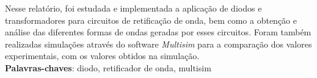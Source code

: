 \setlength{\absparsep}{18pt} %
 \begin{resumo}
 Nesse relat\'{o}rio, foi estudada e implementada a aplica\c{c}\~{a}o de diodos e transformadores para circuitos de retifica\c{c}\~{a}o de onda, bem como a obten\c{c}\~{a}o e an\'{a}lise das diferentes formas de ondas geradas por esses circuitos. Foram tamb\'{e}m realizadas simula\c{c}\~{o}es atrav\'{e}s do software \textit{Multisim} para a compara\c{c}\~{a}o dos valores experimentais, com os valores obtidos na simula\c{c}\~{a}o. \\
 \noindent
 \textbf{Palavras-chaves}: diodo, retificador de onda, multisim
\end{resumo} 